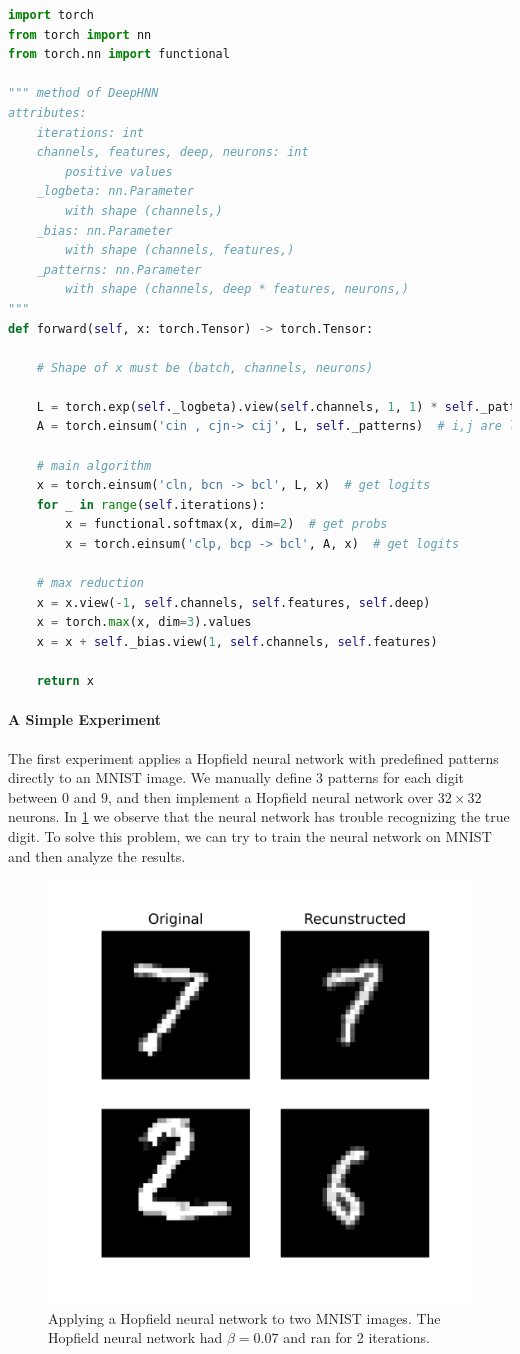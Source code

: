 \newpage

\begin{lstlisting}[style=code, label=alg:HNN_forward, caption=DeepHNN forward pass, language=Python]
import torch
from torch import nn
from torch.nn import functional

""" method of DeepHNN
attributes:
    iterations: int
    channels, features, deep, neurons: int
        positive values
    _logbeta: nn.Parameter
        with shape (channels,)
    _bias: nn.Parameter
        with shape (channels, features,)
    _patterns: nn.Parameter
        with shape (channels, deep * features, neurons,)
"""
def forward(self, x: torch.Tensor) -> torch.Tensor:

    # Shape of x must be (batch, channels, neurons)

    L = torch.exp(self._logbeta).view(self.channels, 1, 1) * self._patterns
    A = torch.einsum('cin , cjn-> cij', L, self._patterns)  # i,j are logits

    # main algorithm
    x = torch.einsum('cln, bcn -> bcl', L, x)  # get logits
    for _ in range(self.iterations):
        x = functional.softmax(x, dim=2)  # get probs
        x = torch.einsum('clp, bcp -> bcl', A, x)  # get logits

    # max reduction
    x = x.view(-1, self.channels, self.features, self.deep)
    x = torch.max(x, dim=3).values
    x = x + self._bias.view(1, self.channels, self.features)

    return x
\end{lstlisting}

\paragraph{A Simple Experiment}
The first experiment applies a Hopfield neural network with predefined patterns directly to an MNIST image. We manually define $3$ patterns for each digit between $0$ and $9$, and then implement a Hopfield neural network over $32 \times 32$ neurons. In \cref{fig:SimpleExp} we observe that the neural network has trouble recognizing the true digit. To solve this problem, we can try to train the neural network on MNIST and then analyze the results.

\begin{figure}[htbp]
    \centering
    \includegraphics[width=0.5\linewidth]{Figures/SimpleExp.png}
    \caption{Applying a Hopfield neural network to two MNIST images. The Hopfield neural network had $\beta = 0.07$ and ran for 2 iterations.}
    \label{fig:SimpleExp}
\end{figure}

